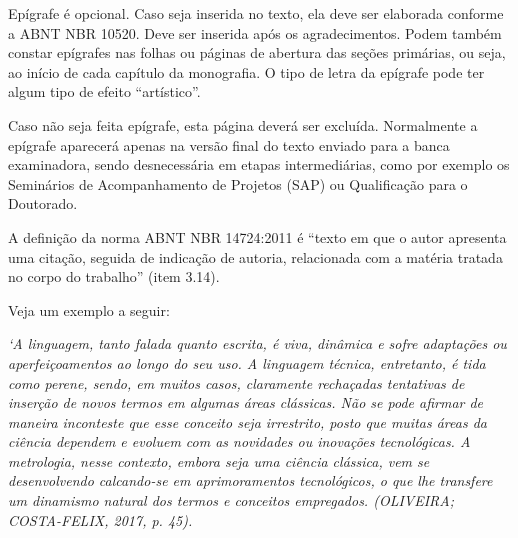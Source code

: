 \begin{epigrafe}
    \vspace*{\fill}
  
Epígrafe é opcional. Caso seja inserida no texto, ela deve ser elaborada conforme a ABNT NBR 10520. Deve ser inserida após os agradecimentos. Podem também constar epígrafes nas folhas ou páginas de abertura das seções primárias, ou seja, ao início de cada capítulo da monografia. O tipo de letra da epígrafe pode ter algum tipo de efeito “artístico”.

Caso não seja feita epígrafe, esta página deverá ser excluída. Normalmente a epígrafe aparecerá apenas na versão final do texto enviado para a banca examinadora, sendo desnecessária em etapas intermediárias, como por exemplo os Seminários de Acompanhamento de Projetos (SAP) ou Qualificação para o Doutorado.

A definição da norma ABNT NBR 14724:2011 é “texto em que o autor apresenta uma citação, seguida de indicação de autoria, relacionada com a matéria tratada no corpo do trabalho” (item 3.14).

Veja um exemplo a seguir:
	\begin{flushright}
		\textit{`A linguagem, tanto falada quanto escrita, é viva, dinâmica e sofre adaptações ou aperfeiçoamentos ao longo do seu uso. A linguagem técnica, entretanto, é tida como perene, sendo, em muitos casos, claramente rechaçadas tentativas de inserção de novos termos em algumas áreas clássicas. Não se pode afirmar de maneira inconteste que esse conceito seja irrestrito, posto que muitas áreas da ciência dependem e evoluem com as novidades ou inovações tecnológicas. A metrologia, nesse contexto, embora seja uma ciência clássica, vem se desenvolvendo calcando-se em aprimoramentos tecnológicos, o que lhe transfere um dinamismo natural dos termos e conceitos empregados.
(OLIVEIRA; COSTA-FELIX, 2017, p. 45).
}
	\end{flushright}
\end{epigrafe}
